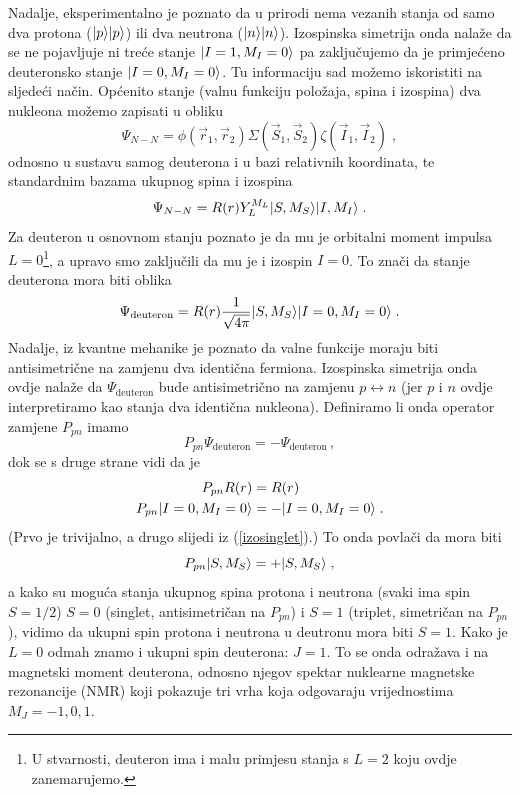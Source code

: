 \begin{primjer}[deuteron]
Nadalje, eksperimentalno je poznato da u prirodi nema vezanih stanja
od samo dva protona ($| p \rangle| p \rangle$)  ili dva neutrona
($| n \rangle| n \rangle$). Izospinska simetrija onda nalaže da se ne pojavljuje
ni treće stanje $| I=1, M_I=0 \rangle$ pa zaključujemo da je primjećeno deuteronsko
stanje $| I=0, M_I = 0 \rangle$.
Tu informaciju sad možemo iskoristiti na sljedeći način. Općenito
stanje (valnu funkciju položaja, spina i izospina) dva nukleona možemo zapisati u obliku
\begin{equation}
 \Psi_{N-N} = \phi(\vec{r}_1, \vec{r}_2) \Sigma(\vec{S}_1, \vec{S}_2)
\zeta(\vec{I}_1, \vec{I}_2) \;,
\end{equation}
odnosno u sustavu samog deuterona i u bazi relativnih koordinata, te
standardnim bazama ukupnog spina i izospina
\begin{equation}
 \Psi_{N-N} = R(r) Y^{M_L}_{L} | S, M_S \rangle | I, M_I \rangle \;.
\end{equation}
Za deuteron u osnovnom stanju poznato je da mu je orbitalni moment
impulsa $L=0$\footnote{U stvarnosti, deuteron ima i malu primjesu
stanja s $L=2$ koju ovdje zanemarujemo.}, a upravo smo zaključili 
da mu je i izospin $I=0$.
To znači da stanje deuterona mora biti oblika
\begin{equation}
\Psi_{\text{deuteron}} = R(r) \frac{1}{\sqrt{4\pi}} 
| S, M_S \rangle | I=0,M_I=0 \rangle\;.
\end{equation}
Nadalje, iz kvantne mehanike je poznato da valne funkcije moraju biti
antisimetrične na zamjenu dva identična fermiona. Izospinska
simetrija onda ovdje nalaže da $\Psi_{\text{deuteron}}$ bude
antisimetrično na zamjenu $p\leftrightarrow n$ (jer $p$ i $n$
ovdje interpretiramo kao stanja dva identična nukleona).
Definiramo li onda
operator zamjene $P_{pn}$ imamo
\begin{equation}
   P_{pn} \Psi_{\text{deuteron}} = - \Psi_{\text{deuteron}} \,,
\end{equation}
dok se s druge strane vidi da je
\begin{align}
P_{pn} R(r) &= R(r) \\
P_{pn} | I=0,M_I=0 \rangle &= - | I=0,M_I=0 \rangle \;.
\end{align}
(Prvo je trivijalno, a drugo slijedi iz (\ref{izosinglet}).)
To onda povlači da mora biti
\begin{equation}
 P_{pn} | S, M_S \rangle = + | S, M_S \rangle \;,
\end{equation}
a kako su moguća stanja ukupnog spina protona i neutrona (svaki ima spin
$S=1/2$) $S=0$ (singlet, antisimetričan
na $P_{pn}$) i $S=1$ (triplet, simetričan na $P_{pn}$), vidimo da
ukupni spin protona i neutrona u deutronu mora biti $S=1$. Kako
je $L=0$ odmah znamo i ukupni spin deuterona: $J=1$.
To se onda odražava i na magnetski moment deuterona, odnosno
njegov spektar nuklearne magnetske rezonancije (NMR) koji pokazuje
tri vrha koja odgovaraju vrijednostima $M_J = -1, 0, 1$.
\end{primjer}

